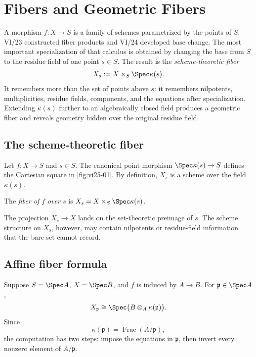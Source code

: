 \chapter{Fibers and Geometric Fibers}\label{ch:vi25-fibers-geometric-fibers}

A morphism $f:X\to S$ is a family of schemes parametrized by the points of $S$.  VI/23 constructed
fiber products and VI/24 developed base change.  The most important specialization of that calculus
is obtained by changing the base from $S$ to the residue field of one point $s\in S$.  The result is
the \emph{scheme-theoretic fiber}
\[
X_s:=X\times_S\Spec\kappa(s).
\]
It remembers more than the set of points above $s$: it remembers nilpotents, multiplicities, residue
fields, components, and the equations after specialization.  Extending $\kappa(s)$ further to an
algebraically closed field produces a geometric fiber and reveals geometry hidden over the original
residue field.

\section{The scheme-theoretic fiber}
Let $f:X\to S$ and $s\in S$.  The canonical point morphism $\Spec\kappa(s)\to S$ defines the Cartesian square in
\cref{fig:vi25-01}.  By definition, $X_s$ is a scheme over the field $\kappa(s)$.



\begin{definition}[Fiber]\label{def:vi25-fiber}
The \emph{fiber of $f$ over $s$} is $X_s=X\times_S\Spec\kappa(s)$.
\end{definition}

The projection $X_s\to X$ lands on the set-theoretic preimage of $s$.  The scheme structure on
$X_s$, however, may contain nilpotents or residue-field information that the bare set cannot record.

\section{Affine fiber formula}
Suppose $S=\Spec A$, $X=\Spec B$, and $f$ is induced by $A\to B$.  For
$\mathfrak p\in\Spec A$,
\[
X_{\mathfrak p}\cong
\Spec\bigl(B\otimes_A\kappa(\mathfrak p)\bigr).
\]
Since
\[
\kappa(\mathfrak p)=\operatorname{Frac}(A/\mathfrak p),
\]
the computation has two steps: impose the equations in $\mathfrak p$, then invert every nonzero
element of $A/\mathfrak p$.

